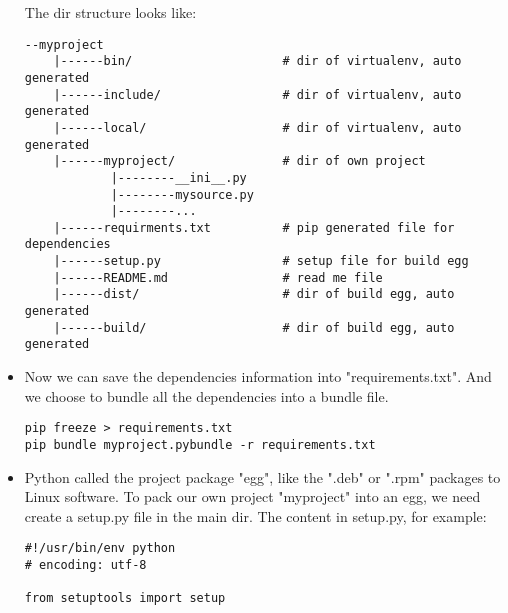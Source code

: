 \begin{itemize}
The dir structure looks like:
\begin{lstlisting}
--myproject
    |------bin/                     # dir of virtualenv, auto generated
    |------include/                 # dir of virtualenv, auto generated
    |------local/                   # dir of virtualenv, auto generated
    |------myproject/               # dir of own project 
            |--------__ini__.py
            |--------mysource.py
            |--------...
    |------requirments.txt          # pip generated file for dependencies
    |------setup.py                 # setup file for build egg
    |------README.md                # read me file
    |------dist/                    # dir of build egg, auto generated
    |------build/                   # dir of build egg, auto generated
\end{lstlisting}
\item
Now we can save the dependencies information into "requirements.txt". And we choose to bundle all the dependencies into a bundle file.
\begin{lstlisting}
pip freeze > requirements.txt
pip bundle myproject.pybundle -r requirements.txt
\end{lstlisting}
\item
Python called the project package "egg", like the ".deb" or ".rpm" packages to Linux software. 
To pack our own project "myproject" into an egg, we need create a setup.py file in the main dir.
The content in setup.py, for example:
\begin{lstlisting}
#!/usr/bin/env python
# encoding: utf-8

from setuptools import setup


\end{lstlisting}
\end{itemize}
